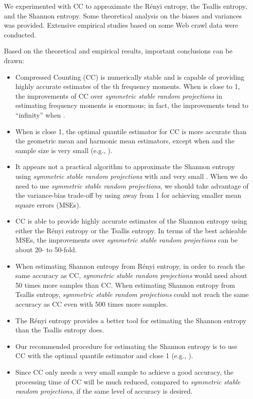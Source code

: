 \documentclass{sig-alternate}
\begin{document}
We experimented with CC to approximate the R\'enyi entropy, the Tsallis entropy, and the Shannon entropy. Some theoretical analysis on the biases and variances was provided. Extensive empirical studies based on some Web crawl data were conducted.

Based on the theoretical and empirical results, important conclusions can be drawn:
\begin{itemize}
\item Compressed Counting (CC) is numerically stable and is capable of providing highly accurate estimates of the th frequency moments. When  is close to 1, the improvements of CC over {\em symmetric stable random projections} in estimating frequency moments is enormous; in fact, the improvements tend to ``infinity'' when .
\item When  is close 1,  the optimal quantile estimator for CC is more accurate than the geometric mean and harmonic mean estimators, except when  and the sample size  is very small (e.g., ).
\item It appears not a practical algorithm to approximate the Shannon entropy using {\em symmetric stable random projections} with   and very small . When we do need to use {\em symmetric stable random projections}, we should take advantage of the variance-bias trade-off by using  away from 1 for achieving smaller mean square errors (MSEs).

\item CC is able to provide highly accurate estimates of the Shannon entropy using either the R\'enyi entropy or the Tsallis entropy. In terms of the best achieable MSEs, the improvements over {\em symmetric stable random projections} can be about 20- to 50-fold.
\item When estimating Shannon entropy from R\'enyi entropy, in order to reach the same accuracy as CC, {\em symmetric stable random projections} would need about 50 times more samples than CC. When estimating Shannon entropy from Tsallis entropy, {\em symmetric stable random projections}  could not reach the same accuracy as CC even with 500 times more samples.
\item The R\'enyi entropy provides a better tool for estimating the Shannon entropy than the Tsallis entropy does.
\item Our recommended procedure for estimating the Shannon entropy is to use CC with the optimal quantile estimator and  close 1 (e.g., ).
\item Since CC only needs a very small sample to achieve a good accuracy, the processing time of CC will be much reduced, compared to {\em symmetric stable random projections}, if the same level of accuracy is desired.
\end{itemize}
\end{document}
